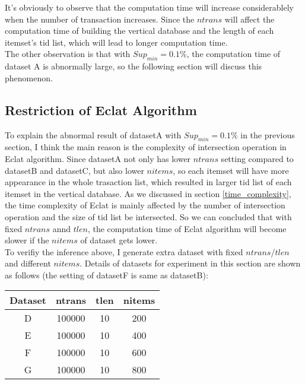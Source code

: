 \documentclass[a4paper, oneside, final, 12pt]{scrartcl} %
\begin{document}
It's obviously to observe that the computation time will increase considerablely
when the number of transaction increases. Since the $ntrans$ will affect the computation time
of building the vertical database and the length of each itemset's tid list, which will lead to
longer computation time. \\
The other observation is that with $Sup_{min} = 0.1\%$, the computation time of dataset A
is abnormally large, so the following section will discuss this phenomenon.

\subsection{Restriction of Eclat Algorithm}

To explain the abnormal result of datasetA with $Sup_{min} = 0.1\%$ in the previous section,
I think the main reason is the complexity of intersection operation in Eclat algorithm. 
Since datasetA not only has lower $ntrans$ setting compared to datasetB and datasetC,
but also lower $nitems$, so each itemset will have more appearance in the whole trasaction list,
which resulted in larger tid list of each itemset in the vertical database.
As we discussed in section \ref{time_complexity}, the time complexity of Eclat
is mainly affected by the number of intersection operation and the size of tid list be intersected.
So we can concluded that with fixed $ntrans$ annd $tlen$, the computation time of Eclat algorithm
will become slower if the $nitems$ of dataset gets lower. \\

To verifiy the inference above,
I generate extra dataset with fixed $ntrans$/$tlen$ and different $nitems$.
Details of datasets for experiment in this section are shown as follows
(the setting of datasetF is same as datasetB):

\begin{table}[h]
  \center
  \begin{tabular}{|*{4}{c|}}
    \hline
    Dataset & ntrans & tlen & nitems \\
    \hline
    D & 100000 & 10 & 200 \\ \cline{1-4}
    E & 100000 & 10 & 400 \\ \cline{1-4}
    F & 100000 & 10 & 600 \\ \cline{1-4}
    G & 100000 & 10 & 800 \\ 
    \hline
  \end{tabular}
\end{table}
\end{document}
